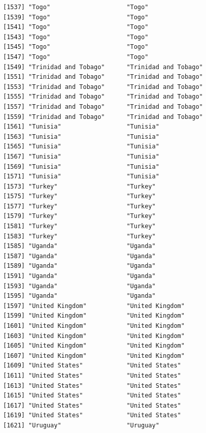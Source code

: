 \documentclass[
  letterpaper,
  DIV=11,
  numbers=noendperiod]{scrreprt}
\begin{document}
\begin{verbatim}
[1537] "Togo"                     "Togo"                    
[1539] "Togo"                     "Togo"                    
[1541] "Togo"                     "Togo"                    
[1543] "Togo"                     "Togo"                    
[1545] "Togo"                     "Togo"                    
[1547] "Togo"                     "Togo"                    
[1549] "Trinidad and Tobago"      "Trinidad and Tobago"     
[1551] "Trinidad and Tobago"      "Trinidad and Tobago"     
[1553] "Trinidad and Tobago"      "Trinidad and Tobago"     
[1555] "Trinidad and Tobago"      "Trinidad and Tobago"     
[1557] "Trinidad and Tobago"      "Trinidad and Tobago"     
[1559] "Trinidad and Tobago"      "Trinidad and Tobago"     
[1561] "Tunisia"                  "Tunisia"                 
[1563] "Tunisia"                  "Tunisia"                 
[1565] "Tunisia"                  "Tunisia"                 
[1567] "Tunisia"                  "Tunisia"                 
[1569] "Tunisia"                  "Tunisia"                 
[1571] "Tunisia"                  "Tunisia"                 
[1573] "Turkey"                   "Turkey"                  
[1575] "Turkey"                   "Turkey"                  
[1577] "Turkey"                   "Turkey"                  
[1579] "Turkey"                   "Turkey"                  
[1581] "Turkey"                   "Turkey"                  
[1583] "Turkey"                   "Turkey"                  
[1585] "Uganda"                   "Uganda"                  
[1587] "Uganda"                   "Uganda"                  
[1589] "Uganda"                   "Uganda"                  
[1591] "Uganda"                   "Uganda"                  
[1593] "Uganda"                   "Uganda"                  
[1595] "Uganda"                   "Uganda"                  
[1597] "United Kingdom"           "United Kingdom"          
[1599] "United Kingdom"           "United Kingdom"          
[1601] "United Kingdom"           "United Kingdom"          
[1603] "United Kingdom"           "United Kingdom"          
[1605] "United Kingdom"           "United Kingdom"          
[1607] "United Kingdom"           "United Kingdom"          
[1609] "United States"            "United States"           
[1611] "United States"            "United States"           
[1613] "United States"            "United States"           
[1615] "United States"            "United States"           
[1617] "United States"            "United States"           
[1619] "United States"            "United States"           
[1621] "Uruguay"                  "Uruguay"                 

\end{verbatim}
\end{document}

